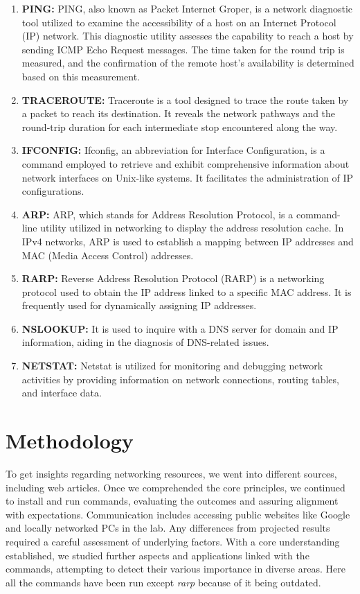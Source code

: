 \documentclass[11pt]{article}
\begin{document}
\begin{enumerate}
	\item \textbf{PING:} 
	PING, also known as Packet Internet Groper, is a network diagnostic tool utilized to examine the accessibility of a host on an Internet Protocol (IP) network. This diagnostic utility assesses the capability to reach a host by sending ICMP Echo Request messages. The time taken for the round trip is measured, and the confirmation of the remote host's availability is determined based on this measurement.
	\item \textbf{TRACEROUTE:} 
	Traceroute is a tool designed to trace the route taken by a packet to reach its destination. It reveals the network pathways and the round-trip duration for each intermediate stop encountered along the way.
	\item \textbf{IFCONFIG:} Ifconfig, an abbreviation for Interface Configuration, is a command employed to retrieve and exhibit comprehensive information about network interfaces on Unix-like systems. It facilitates the administration of IP configurations.
	\item \textbf{ARP:} ARP, which stands for Address Resolution Protocol, is a command-line utility utilized in networking to display the address resolution cache. In IPv4 networks, ARP is used to establish a mapping between IP addresses and MAC (Media Access Control) addresses.
	\item \textbf{RARP:} 
	Reverse Address Resolution Protocol (RARP) is a networking protocol used to obtain the IP address linked to a specific MAC address. It is frequently used for dynamically assigning IP addresses.
	\item \textbf{NSLOOKUP:} 
	It is used to inquire with a DNS server for domain and IP information, aiding in the diagnosis of DNS-related issues.
	\item \textbf{NETSTAT:} Netstat is utilized for monitoring and debugging network activities by providing information on network connections, routing tables, and interface data.

\end{enumerate}



\section{Methodology}

To get insights regarding networking resources, we went into different sources, including web articles. Once we comprehended the core principles, we continued to install and run commands, evaluating the outcomes and assuring alignment with expectations. Communication includes accessing public websites like Google and locally networked PCs in the lab. Any differences from projected results required a careful assessment of underlying factors. With a core understanding established, we studied further aspects and applications linked with the commands, attempting to detect their various importance in diverse areas. Here all the commands have been run except \emph{rarp} because of it being outdated.
\end{document}
